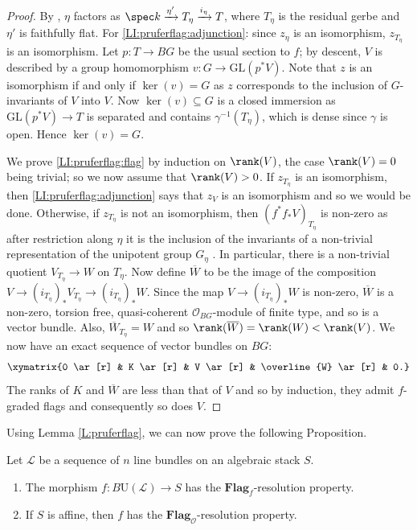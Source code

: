 \documentclass[reqno,a4paper]{amsart}
\numberwithin{Theorem}{section}
\newcommand{\Orb}{\mathcal{O}}
\renewcommand{\GL}{\mathrm{GL}}
\renewcommand{\U}{\mathrm{U}}
\newcommand{\Flag}{\mathbf{Flag}}
\theoremstyle{plain}
\theoremstyle{remark}
\newcommand{\classB}{B}
\begin{document}
\begin{proof}  
  By \cite[Thm.~B.2]{MR2774654}, $\eta$ factors as
  $\spec k \xrightarrow{\eta'} T_\eta \xrightarrow{i_\eta} T$, where
  $T_\eta$ is the residual gerbe and $\eta'$ is faithfully flat. For
  \eqref{LI:pruferflag:adjunction}: since $z_\eta$ is an isomorphism,
  $z_{T_\eta}$ is an isomorphism. Let $p\colon T \to \classB G$ be the
  usual section to $f$; by descent, $V$ is described by a group
  homomorphism $v \colon G \to \GL(p^*V)$. Note that $z$ is an isomorphism if
  and only if $\ker(v) = G$ as $z$ corresponds to the inclusion of
  $G$-invariants of $V$ into $V$. Now $\ker(v) \subseteq G$ is a
  closed immersion as $\GL(p^*V) \to T$ is separated and contains
  $\gamma^{-1}(T_\eta)$, which is dense since $\gamma$ is open.  Hence
  $\ker(v) = G$.

  We prove \eqref{LI:pruferflag:flag} by induction on $\rank (V)$, the
  case $\rank(V) = 0$ being trivial; so we now assume that
  $\rank(V) > 0$. If $z_{T_\eta}$ is an isomorphism, then
  \eqref{LI:pruferflag:adjunction} says that $z_V$ is an isomorphism
  and so we would be done. Otherwise, if $z_{T_\eta}$ is not an
  isomorphism, then $(f^*f_*V)_{T_\eta}$ is non-zero as after restriction along $\eta$ it is the
  inclusion of the invariants of a non-trivial representation of the
  unipotent group $G_{\eta}$ \cite[Thm.~XVII.3.5]{SGA3-III-NEW}. In
  particular, there is a non-trivial quotient $V_{T_\eta} \to W$ on
  $T_\eta$. Now define $\overline{W}$ to be the image of the
  composition $V \to (i_{T_\eta})_*V_{T_\eta} \to
  (i_{T_\eta})_*W$. Since the map $V \to (i_{T_\eta})_*W$ is non-zero,
  $\overline{W}$ is a non-zero, torsion free, quasi-coherent
  $\Orb_{\classB G}$-module of finite type, and so is a vector
  bundle. Also, $\overline{W}_{T_\eta} = W$ and so
  $\rank(\overline{W}) = \rank(W) < \rank(V)$.  We now have an
  exact sequence of vector bundles on $\classB G$:
  \[
    \xymatrix{0 \ar[r] & K \ar[r] & V \ar[r] & \overline{W} \ar[r] & 0.}
  \]
  The ranks of $K$ and $\overline{W}$ are less than that of $V$ and so
  by induction, they admit $f$-graded flags and consequently so does
  $V$.
\end{proof}
Using Lemma \ref{L:pruferflag}, we can now prove the following
Proposition.
\begin{proposition} \label{P:ulflag} Let $\mathscr{L}$ be a sequence
  of $n$ line bundles on an algebraic stack $S$.
  \begin{enumerate}
  \item \label{PI:ulflag:flagf} The morphism $f\colon \classB \U(\mathscr{L})\to S$ has the
    $\Flag_f$-resolution property.
\item \label{PI:ulflag:flagO}If $S$ is affine, then $f$ has the $\Flag_{\mathcal{O}}$-resolution property.
\end{enumerate}
\end{proposition}
\end{document}
